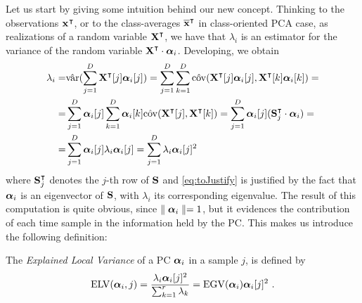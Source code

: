 Let us start by giving some intuition behind our new concept. Thinking to the observations ${\sss[]{}}^\intercal$, or to the class-averages ${\mmmX}^\intercal$ in class-oriented PCA case, as realizations of a random variable $\XXX^\intercal$, we have that $\lambda_i$ is an estimator for the variance of the random variable $\XXX^\intercal\cdot\AAlpha_i$. Developing, we obtain
\begin{align}\label{eq:ELV}
\lambda_i =& \hat{\mathrm{var}}(\sum_{j=1}^D \XXX^\intercal[j]\AAlpha_i[j]) = \sum_{j=1}^D\sum_{k=1}^D \hat{\mathrm{cov}}(\XXX^\intercal[j]\AAlpha_i[j], \XXX^\intercal[k]\AAlpha_i[k])=\\
=& \sum_{j=1}^D \AAlpha_i[j]\sum_{k=1}^D\AAlpha_i[k]\hat{\mathrm{cov}}(\XXX^\intercal[j], \XXX^\intercal[k])= \sum_{j=1}^D \AAlpha_i[j] (\covmat_{j}^\intercal \cdot \AAlpha_i)=  \\
=& \sum_{j=1}^D \AAlpha_i[j] \lambda_i\AAlpha_i[j]= \sum_{j=1}^D  \lambda_i \AAlpha_i[j]^2 \label{eq:toJustify}
\end{align}
where $\covmat_{j}^\intercal$ denotes the $j$-th row of $\covmat$ and \eqref{eq:toJustify} is justified by the fact that $\AAlpha_i$ is an eigenvector of $\covmat$, with $\lambda_i$ its corresponding eigenvalue. The result of this computation is quite obvious, since $\parallel \AAlpha_i\parallel=1$, but it evidences the contribution of each time sample in the information held by the PC. This makes us introduce the following definition:
\begin{definition}


The {\em Explained Local Variance} of a PC $\AAlpha_i$ in a sample $j$, is defined by
\begin{equation}
\mathrm{ELV}(\AAlpha_i,j) = \frac{\lambda_i \AAlpha_i[j]^2}{\sum_{k=1}^r\lambda_k} = \mathrm{EGV}(\AAlpha_i) \AAlpha_i[j]^2  \mbox{ .}
\end{equation}
\end{definition}
